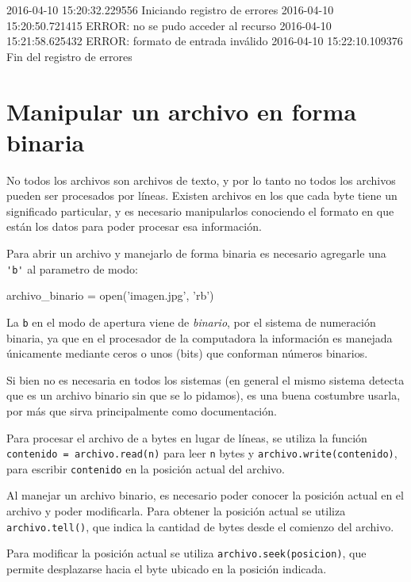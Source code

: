 \begin{codigo-nohl-sn}
2016-04-10 15:20:32.229556 Iniciando registro de errores
2016-04-10 15:20:50.721415 ERROR: no se pudo acceder al recurso
2016-04-10 15:21:58.625432 ERROR: formato de entrada inválido
2016-04-10 15:22:10.109376 Fin del registro de errores
\end{codigo-nohl-sn}

\section{Manipular un archivo en forma binaria}

No todos los archivos son archivos de texto, y por lo tanto no todos los
archivos pueden ser procesados por líneas. Existen archivos en los que cada
byte tiene un significado particular, y es necesario manipularlos conociendo
el formato en que están los datos para poder procesar esa información.

Para abrir un archivo y manejarlo de forma binaria es necesario agregarle
una \verb!'b'! al parametro de modo:

\begin{codigo-python-sn}
archivo_binario = open('imagen.jpg', 'rb')
\end{codigo-python-sn}

\begin{sabias_que}
La \texttt{b} en el modo de apertura viene de \textit{binario}, por el
sistema de numeración binaria, ya que en el procesador de la computadora la
información es manejada únicamente mediante ceros o unos (bits) que
conforman números binarios.

Si bien no es necesaria en todos los sistemas (en general el mismo sistema
detecta que es un archivo binario sin que se lo pidamos), es una buena
costumbre usarla, por más que sirva principalmente como documentación.
\end{sabias_que}

Para procesar el archivo de a bytes en lugar de líneas, se utiliza la
función \lstinline!contenido = archivo.read(n)! para leer \lstinline!n!
bytes y \lstinline!archivo.write(contenido)!, para
escribir \lstinline!contenido! en la posición actual del archivo.

Al manejar un archivo binario, es necesario poder conocer la
posición actual en el archivo y poder modificarla. Para obtener la
posición actual se utiliza \lstinline!archivo.tell()!, que
indica la cantidad de bytes desde el comienzo del archivo.

Para modificar la posición actual se utiliza
\lstinline!archivo.seek(posicion)!, que permite desplazarse hacia el byte
ubicado en la posición indicada.

